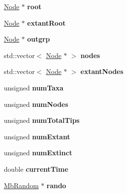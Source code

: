 \begin{DoxyCompactItemize}
\item 
\mbox{\label{class_tree_ad8e46ce0aead5778cbdd784d1e370d5f}} 
\mbox{\hyperlink{class_node}{Node}} $\ast$ {\bfseries root}
\item 
\mbox{\label{class_tree_a3ae8502b493477241406a50cb0cf74d7}} 
\mbox{\hyperlink{class_node}{Node}} $\ast$ {\bfseries extant\+Root}
\item 
\mbox{\label{class_tree_a6e7b2b7c1fe7f83754a17db795d1aa0f}} 
\mbox{\hyperlink{class_node}{Node}} $\ast$ {\bfseries outgrp}
\item 
\mbox{\label{class_tree_ae5f01790f27d8d3e6b05f4cb4d3a963e}} 
std\+::vector$<$ \mbox{\hyperlink{class_node}{Node}} $\ast$ $>$ {\bfseries nodes}
\item 
\mbox{\label{class_tree_a74584e5f9bc5917202c72fd2654db906}} 
std\+::vector$<$ \mbox{\hyperlink{class_node}{Node}} $\ast$ $>$ {\bfseries extant\+Nodes}
\item 
\mbox{\label{class_tree_a629f2ba59432dedd2aabd507f8101758}} 
unsigned {\bfseries num\+Taxa}
\item 
\mbox{\label{class_tree_ac81f7ba8069985a4891ad6596078f96e}} 
unsigned {\bfseries num\+Nodes}
\item 
\mbox{\label{class_tree_a70bc3919efa4f4b90ea2d36ba46fff2b}} 
unsigned {\bfseries num\+Total\+Tips}
\item 
\mbox{\label{class_tree_ae0a13090b405156713927015a6493d7a}} 
unsigned {\bfseries num\+Extant}
\item 
\mbox{\label{class_tree_a64386001335e337564edd20f67d8b461}} 
unsigned {\bfseries num\+Extinct}
\item 
\mbox{\label{class_tree_ac39ea17b4c3526658b21ef5a0b35b6a8}} 
double {\bfseries current\+Time}
\item 
\mbox{\label{class_tree_aaab6ace75d1a7324d6dd5a0c44830386}} 
\mbox{\hyperlink{class_mb_random}{Mb\+Random}} $\ast$ {\bfseries rando}
\end{DoxyCompactItemize}
